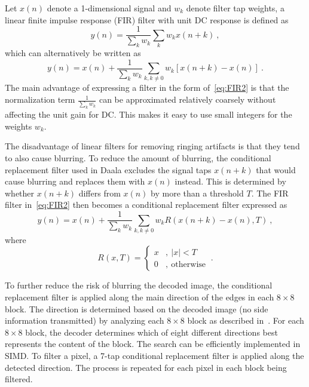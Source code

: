 \documentclass[english,conference,10pt]{IEEEtran}
\begin{document}
Let $x\left(n\right)$ denote a 1-dimensional signal and $w_{k}$
denote filter tap weights, a linear finite impulse response (FIR)
filter with unit DC response is defined as
\begin{equation}
y\left(n\right)=\frac{1}{\sum_{k}w_{k}}\sum_{k}w_{k}x\left(n+k\right)\ ,\label{eq:FIR1}
\end{equation}
which can alternatively be written as
\begin{equation}
y\left(n\right)=x\left(n\right)+\frac{1}{\sum_{k}w_{k}}\sum_{k,k\neq0}w_{k}\left[x\left(n+k\right)-x\left(n\right)\right]\ .\label{eq:FIR2}
\end{equation}
The main advantage of expressing a filter in the form of~\cref{eq:FIR2}
is that the normalization term $\frac{1}{\sum_{k}w_{k}}$ can be approximated
relatively coarsely without affecting the unit gain for DC. This makes
it easy to use small integers for the weights $w_{k}$.

The disadvantage of linear filters for removing ringing artifacts
is that they tend to also cause blurring. To reduce the amount of
blurring, the conditional replacement filter used in Daala excludes
the signal taps $x\left(n+k\right)$ that would cause blurring and
replaces them with $x\left(n\right)$ instead. This is determined
by whether $x\left(n+k\right)$ differs from $x\left(n\right)$ by
more than a threshold $T$. The FIR filter in~\cref{eq:FIR2}
then becomes a conditional replacement filter expressed as
\begin{equation}
y\left(n\right)=x\left(n\right)+\frac{1}{\sum_{k}w_{k}}\sum_{k,k\neq0}w_{k}R\left(x\left(n+k\right)-x\left(n\right),T\right)\ ,\label{eq:CRF}
\end{equation}
where
\begin{equation}
R\left(x,T\right)=\left\{ \begin{array}{ll}
x & ,\ \left|x\right|<T\\
0 & ,\ \mathrm{otherwise}
\end{array}\right.\ .
\end{equation}

To further reduce the risk of blurring the decoded image, the conditional
replacement filter is applied along the main direction of the edges
in each $8\times 8$ block. The direction is determined based on the decoded image
(no side information transmitted) by analyzing each $8\times 8$ block as described
in~\cite{ValinDeringing}. For each $8\times 8$ block, the decoder determines which
of eight different directions best represents the content of the block.
The search can be efficiently implemented in SIMD. To filter a pixel, a 7-tap
conditional replacement filter is applied along the detected direction.
The process is repeated for each pixel in each block being filtered.
\end{document}
